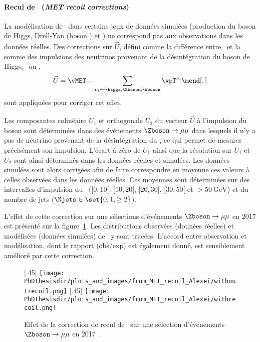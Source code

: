 \paragraph{Recul de \MET\ (\emph{MET recoil corrections})}
La modélisation de \MET\ dans certains jeux de données simulées (production du boson de Higgs, Drell-Yan (boson \Zboson) et \Wjets) ne correspond pas aux observations dans les données réelles.
Des corrections sur $\vec{U}$, défini comme la différence entre \MET\ et la somme des impulsions des neutrinos provenant de la désintégration du boson de Higgs, \Zboson\ ou \Wboson, \ie
\begin{equation}
\vec{U} = \vMET - \sum_{\nu_i \leftarrow \higgs,\Zboson,\Wboson} \vpT^{\nu_i}
\mend[,]
\end{equation}
sont appliquées pour corriger cet effet.
\par
Les composantes colinéaire $U_1$ et orthogonale $U_2$ du vecteur $\vec{U}$ à l'impulsion du boson sont déterminées dans des événements $\Zboson\to\mu\mu$ dans lesquels il n'y a pas de neutrino provenant de la désintégration du \Zboson, ce qui permet de mesurer précisément son impulsion.
L'écart à zéro de $U_1$ ainsi que la résolution sur $U_1$ et $U_2$ sont ainsi déterminés dans les données réelles et simulées.
Les données simulées sont alors corrigées afin de faire correspondre en moyenne ces valeurs à celles observées dans les données réelles.
Ces moyennes sont déterminées sur des intervalles d'impulsion du \Zboson\ ($[\num{0}, \num{10}[$, $[\num{10}, \num{20}[$, $[\num{20}, \num{30}[$, $[\num{30}, \num{50}[$ et $>\SI{50}{\GeV}$) et du nombre de jets ($\Njets\in\set{0, 1, \geq2}$).
\par
L'effet de cette correction sur une sélections d'événements $\Zboson\to\mu\mu$ en 2017 est présenté sur la figure~\ref{fig-MET_recoil_Alexei}.
Les distributions observées (données réelles) et modélisées (données simulées) de \MET\ y sont tracées.
L'accord entre observation et modélisation, dont le rapport (obs/exp) est également donné, est sensiblement amélioré par cette correction.
\begin{figure}[h]
\centering

[.45\textwidth]
{\texttt{[image: \\PhDthesisdir/plots\_and\_images/from\_MET\_recoil\_Alexei/withoutrecoil.png]}}
\hfill
{}[.45\textwidth]
{\texttt{[image: \\PhDthesisdir/plots\_and\_images/from\_MET\_recoil\_Alexei/withrecoil.png]}}

\caption[Effet de la correction de recul de \MET.]{Effet de la correction de recul de \MET\ sur une sélection d'événements $\Zboson\to\mu\mu$ en 2017~\cite{MET_recoil_Alexei}.}
\label{fig-MET_recoil_Alexei}
\end{figure}
